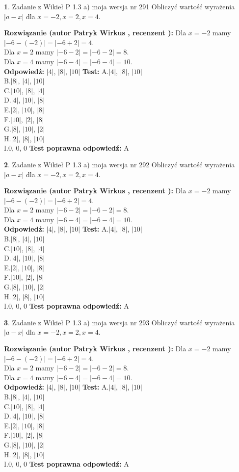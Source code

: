 \documentclass[12pt, a4paper]{article}
\theoremstyle{definition} %
\newtheorem{zad}{}
\newcommand{\zadStart}[1]{\begin{zad}#1\newline}
\newcommand{\zadStop}{\end{zad}}
\newcommand{\rozwStart}[2]{\noindent \textbf{Rozwiązanie (autor #1 , recenzent #2): }\newline}
\newcommand{\rozwStop}{\newline}
\newcommand{\odpStart}{\noindent \textbf{Odpowiedź:}\newline}
\newcommand{\odpStop}{\newline}
\newcommand{\testStart}{\noindent \textbf{Test:}\newline}
\newcommand{\testStop}{\newline}
\newcommand{\kluczStart}{\noindent \textbf{Test poprawna odpowiedź:}\newline}
\newcommand{\kluczStop}{\newline}
\begin{document}
\zadStart{Zadanie z Wikieł P 1.3 a) moja wersja nr 291}
Obliczyć wartość wyrażenia $|a - x|$ dla $x=-2,x=2,x=4$.
\zadStop
\rozwStart{Patryk Wirkus}{}
Dla $x = -2$ mamy $|-6 - (-2)| = |-6 + 2| = 4$.\\
Dla $x = 2$ mamy $|-6 - 2| = |-6 - 2| = 8$.\\
Dla $x = 4$ mamy $|-6 - 4| = |-6 - 4| = 10$.\\
\rozwStop
\odpStart
$|4|$, $|8|$, $|10|$
\odpStop
\testStart
A.$|4|$, $|8|$, $|10|$\\
B.$|8|$, $|4|$, $|10|$\\
C.$|10|$, $|8|$, $|4|$\\
D.$|4|$, $|10|$, $|8|$\\
E.$|2|$, $|10|$, $|8|$\\
F.$|10|$, $|2|$, $|8|$\\
G.$|8|$, $|10|$, $|2|$\\
H.$|2|$, $|8|$, $|10|$\\
I.$0$, $0$, $0$
\testStop
\kluczStart
A
\kluczStop



\zadStart{Zadanie z Wikieł P 1.3 a) moja wersja nr 292}
Obliczyć wartość wyrażenia $|a - x|$ dla $x=-2,x=2,x=4$.
\zadStop
\rozwStart{Patryk Wirkus}{}
Dla $x = -2$ mamy $|-6 - (-2)| = |-6 + 2| = 4$.\\
Dla $x = 2$ mamy $|-6 - 2| = |-6 - 2| = 8$.\\
Dla $x = 4$ mamy $|-6 - 4| = |-6 - 4| = 10$.\\
\rozwStop
\odpStart
$|4|$, $|8|$, $|10|$
\odpStop
\testStart
A.$|4|$, $|8|$, $|10|$\\
B.$|8|$, $|4|$, $|10|$\\
C.$|10|$, $|8|$, $|4|$\\
D.$|4|$, $|10|$, $|8|$\\
E.$|2|$, $|10|$, $|8|$\\
F.$|10|$, $|2|$, $|8|$\\
G.$|8|$, $|10|$, $|2|$\\
H.$|2|$, $|8|$, $|10|$\\
I.$0$, $0$, $0$
\testStop
\kluczStart
A
\kluczStop



\zadStart{Zadanie z Wikieł P 1.3 a) moja wersja nr 293}
Obliczyć wartość wyrażenia $|a - x|$ dla $x=-2,x=2,x=4$.
\zadStop
\rozwStart{Patryk Wirkus}{}
Dla $x = -2$ mamy $|-6 - (-2)| = |-6 + 2| = 4$.\\
Dla $x = 2$ mamy $|-6 - 2| = |-6 - 2| = 8$.\\
Dla $x = 4$ mamy $|-6 - 4| = |-6 - 4| = 10$.\\
\rozwStop
\odpStart
$|4|$, $|8|$, $|10|$
\odpStop
\testStart
A.$|4|$, $|8|$, $|10|$\\
B.$|8|$, $|4|$, $|10|$\\
C.$|10|$, $|8|$, $|4|$\\
D.$|4|$, $|10|$, $|8|$\\
E.$|2|$, $|10|$, $|8|$\\
F.$|10|$, $|2|$, $|8|$\\
G.$|8|$, $|10|$, $|2|$\\
H.$|2|$, $|8|$, $|10|$\\
I.$0$, $0$, $0$
\testStop
\kluczStart
A
\kluczStop
\end{document}
